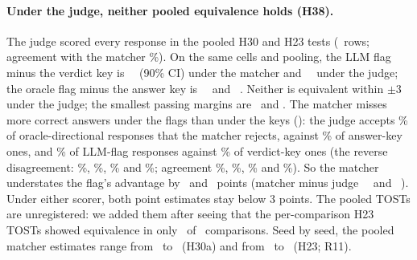 \paragraph{Under the judge, neither pooled equivalence holds (H38).} The  judge scored every response in the
pooled H30 and H23 tests (\jdN\ rows; agreement with the matcher \jdAgree\%). On the same cells and pooling,
the LLM flag minus the verdict key is \jdThirtyM\ \jdThirtyMNinetyCI\ (90\% CI) under the matcher and
\jdThirtyJ\ \jdThirtyJNinetyCI\ under the judge; the oracle flag minus the answer key is \jdTwentyThreeM\
\jdTwentyThreeMNinetyCI\ and \jdTwentyThreeJ\ \jdTwentyThreeJNinetyCI. Neither is equivalent within $\pm$3 under the
judge; the smallest passing margins are \jdThirtyJMargin\ and \jdTwentyThreeJMargin. The matcher misses more correct
answers under the flags than under the keys (\prs{19.2}): the judge accepts \scJudgeOnlyOracleDir\% of
oracle-directional responses that the matcher rejects, against \scJudgeOnlyAnswerKey\% of answer-key ones, and
\scJudgeOnlyLlmDir\% of LLM-flag responses against \scJudgeOnlyVerdictKey\% of verdict-key ones (the reverse
disagreement: \scMatcherOnlyOracleDir\%, \scMatcherOnlyAnswerKey\%, \scMatcherOnlyLlmDir\% and
\scMatcherOnlyVerdictKey\%; agreement \scAgreeOracleDir\%, \scAgreeAnswerKey\%, \scAgreeLlmDir\% and
\scAgreeVerdictKey\%). So the matcher understates the flag's advantage by \ajdThirtyShift\ and
\ajdTwentyThreeShift\ points (matcher minus judge \jdThirtyShift\ \jdThirtyShiftCI\ and \jdTwentyThreeShift\
\jdTwentyThreeShiftCI). Under either scorer, both point estimates stay below 3 points. The pooled TOSTs are
unregistered: we added them after seeing that the per-comparison H23 TOSTs showed equivalence in only
\hTwentyThreeEqN\ of \hTwentyThreeK\ comparisons. Seed by seed, the pooled matcher estimates range from \seedThirtyALo\ to \seedThirtyAHi\ (H30a) and from
\seedTwentyThreeLo\ to \seedTwentyThreeHi\ (H23; R11).

